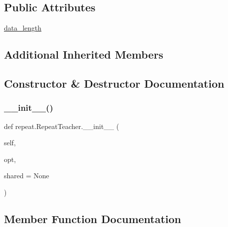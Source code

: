 \subsection*{Public Attributes}
\begin{DoxyCompactItemize}
\item 
\hyperlink{classrepeat_1_1RepeatTeacher_abc46f01649c8af2c60124d7946a95e98}{data\+\_\+length}
\end{DoxyCompactItemize}
\subsection*{Additional Inherited Members}


\subsection{Constructor \& Destructor Documentation}
\mbox{\label{classrepeat_1_1RepeatTeacher_a47b110b0dcdf457e357f1824fb348657}} 
\subsubsection{\texorpdfstring{\+\_\+\+\_\+init\+\_\+\+\_\+()}{\_\_init\_\_()}}
{\footnotesize\ttfamily def repeat.\+Repeat\+Teacher.\+\_\+\+\_\+init\+\_\+\+\_\+ (\begin{DoxyParamCaption}\item[{}]{self,  }\item[{}]{opt,  }\item[{}]{shared = {\ttfamily None} }\end{DoxyParamCaption})}



\subsection{Member Function Documentation}
\mbox{\label{classrepeat_1_1RepeatTeacher_a9cafb9941e59acc751300cc481cbdf24}} 
